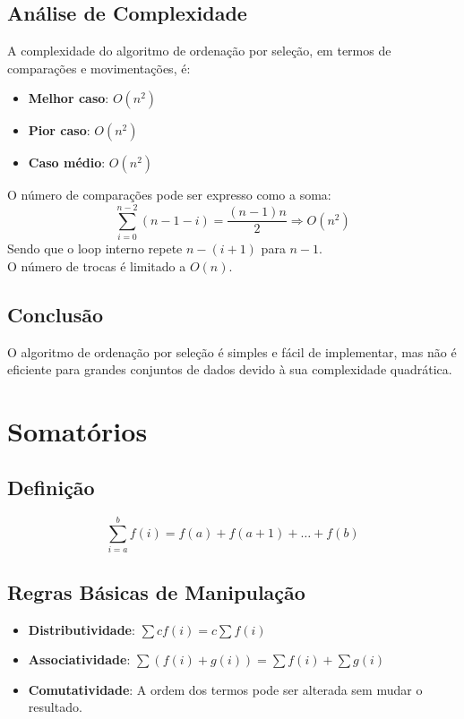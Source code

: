 \documentclass{article}
\begin{document}
\subsection{Análise de Complexidade}
A complexidade do algoritmo de ordenação por seleção, em termos de comparações e movimentações, é:
\begin{itemize}
    \item \textbf{Melhor caso}: $O(n^2)$
    \item \textbf{Pior caso}: $O(n^2)$
    \item \textbf{Caso médio}: $O(n^2)$
\end{itemize}
O número de comparações pode ser expresso como a soma:
\begin{equation}
    \sum_{i=0}^{n-2} (n - 1 - i) = \frac{(n-1)n}{2} \Rightarrow O(n^2)
\end{equation}
Sendo que o loop interno repete $n - (i + 1)$ para $n-1$.\\
O número de trocas é limitado a $O(n)$.

\subsection{Conclusão}
O algoritmo de ordenação por seleção é simples e fácil de implementar, mas não é eficiente para grandes conjuntos de dados devido à sua complexidade quadrática.



\section{Somatórios}

\subsection{Definição}
\begin{equation}
    \sum_{i=a}^{b} f(i) = f(a) + f(a+1) + \dots + f(b)
\end{equation}


\subsection{Regras Básicas de Manipulação}
\begin{itemize}
    \item \textbf{Distributividade}: $\sum c f(i) = c \sum f(i)$
    \item \textbf{Associatividade}: $\sum (f(i) + g(i)) = \sum f(i) + \sum g(i)$
    \item \textbf{Comutatividade}: A ordem dos termos pode ser alterada sem mudar o resultado.
\end{itemize}
\end{document}
